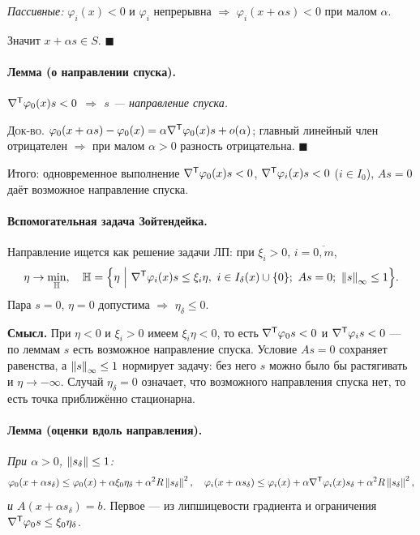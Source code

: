 \emph{Пассивные:} $\varphi_i(x) < 0$ и $\varphi_i$ непрерывна $\Rightarrow$
$\varphi_i(x + \alpha s) < 0$ при малом $\alpha$.

Значит $x + \alpha s \in S$. $\blacksquare$

\paragraph{Лемма (о направлении спуска).}
\textit{$\nabla^{\mathsf{T}}\varphi_0(x)s < 0$ $\Rightarrow$ $s$ — направление спуска.}

\textsc{Док-во.}
$\varphi_0(x+\alpha s) - \varphi_0(x) = \alpha\nabla^{\mathsf{T}}\varphi_0(x)s + o(\alpha)$;
главный линейный член отрицателен $\Rightarrow$ при малом $\alpha > 0$ разность
отрицательна. $\blacksquare$

Итого: одновременное выполнение $\nabla^{\mathsf{T}}\varphi_0(x)s < 0$,
$\nabla^{\mathsf{T}}\varphi_i(x)s < 0$ ($i \in I_0$), $As = 0$ даёт возможное направление
спуска.

\paragraph{Вспомогательная задача Зойтендейка.}
Направление ищется как решение задачи ЛП: при $\xi_i > 0$, $i = \overline{0,m}$,
\[
  \eta \to \min_{\mathbb{H}} ,
  \quad
  \mathbb{H} = \Big\{ \eta \ \Big|\
    \nabla^{\mathsf{T}}\varphi_i(x)s \le \xi_i\eta,\ i \in I_\delta(x)\cup\{0\} ;\
    As = 0 ;\ \left\lVert s \right\rVert_\infty \le 1 \Big\} .
\]
Пара $s = 0$, $\eta = 0$ допустима $\Rightarrow$ $\eta_\delta \le 0$.

\textbf{Смысл.} При $\eta < 0$ и $\xi_i > 0$ имеем $\xi_i\eta < 0$, то есть
$\nabla^{\mathsf{T}}\varphi_0 s < 0$ и $\nabla^{\mathsf{T}}\varphi_i s < 0$ — по леммам $s$ есть
возможное направление спуска. Условие $As = 0$ сохраняет равенства, а
$\left\lVert s \right\rVert_\infty \le 1$ нормирует задачу: без него $s$ можно было бы
растягивать и $\eta \to -\infty$. Случай $\eta_\delta = 0$ означает, что
возможного направления спуска нет, то есть точка приближённо стационарна.

\paragraph{Лемма (оценки вдоль направления).}
\textit{При $\alpha > 0$, $\left\lVert s_\delta \right\rVert \le 1$:}
\[
  \varphi_0(x + \alpha s_\delta) \le \varphi_0(x) + \alpha\xi_0\eta_\delta
    + \alpha^2 R\left\lVert s_\delta \right\rVert^2 ,
  \quad
  \varphi_i(x + \alpha s_\delta) \le \varphi_i(x)
    + \alpha\nabla^{\mathsf{T}}\varphi_i(x)s_\delta + \alpha^2 R\left\lVert s_\delta \right\rVert^2 ,
\]
\textit{и $A(x+\alpha s_\delta) = b$.} Первое — из липшицевости градиента и
ограничения $\nabla^{\mathsf{T}}\varphi_0 s \le \xi_0\eta_\delta$.


